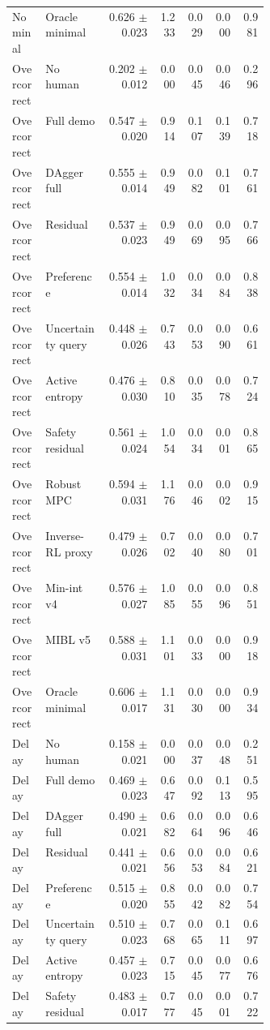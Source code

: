 \documentclass{article}
\begin{document}
\begin{center}
\begin{longtable}{p{0.13\linewidth}p{0.24\linewidth}rrrrr}
Nominal & Oracle minimal & 0.626 $\pm$ 0.023 & 1.233 & 0.029 & 0.000 & 0.981\\
Overcorrect & No human & 0.202 $\pm$ 0.012 & 0.000 & 0.045 & 0.046 & 0.296\\
Overcorrect & Full demo & 0.547 $\pm$ 0.020 & 0.914 & 0.107 & 0.139 & 0.718\\
Overcorrect & DAgger full & 0.555 $\pm$ 0.014 & 0.949 & 0.082 & 0.101 & 0.761\\
Overcorrect & Residual & 0.537 $\pm$ 0.023 & 0.949 & 0.069 & 0.095 & 0.766\\
Overcorrect & Preference & 0.554 $\pm$ 0.014 & 1.032 & 0.034 & 0.084 & 0.838\\
Overcorrect & Uncertainty query & 0.448 $\pm$ 0.026 & 0.743 & 0.053 & 0.090 & 0.661\\
Overcorrect & Active entropy & 0.476 $\pm$ 0.030 & 0.810 & 0.035 & 0.078 & 0.724\\
Overcorrect & Safety residual & 0.561 $\pm$ 0.024 & 1.054 & 0.034 & 0.001 & 0.865\\
Overcorrect & Robust MPC & 0.594 $\pm$ 0.031 & 1.176 & 0.046 & 0.002 & 0.915\\
Overcorrect & Inverse-RL proxy & 0.479 $\pm$ 0.026 & 0.702 & 0.040 & 0.080 & 0.701\\
Overcorrect & Min-int v4 & 0.576 $\pm$ 0.027 & 1.085 & 0.055 & 0.096 & 0.851\\
Overcorrect & MIBL v5 & 0.588 $\pm$ 0.031 & 1.101 & 0.033 & 0.000 & 0.918\\
Overcorrect & Oracle minimal & 0.606 $\pm$ 0.017 & 1.131 & 0.030 & 0.000 & 0.934\\
Delay & No human & 0.158 $\pm$ 0.021 & 0.000 & 0.037 & 0.048 & 0.251\\
Delay & Full demo & 0.469 $\pm$ 0.023 & 0.647 & 0.092 & 0.113 & 0.595\\
Delay & DAgger full & 0.490 $\pm$ 0.021 & 0.682 & 0.064 & 0.096 & 0.646\\
Delay & Residual & 0.441 $\pm$ 0.021 & 0.656 & 0.053 & 0.084 & 0.621\\
Delay & Preference & 0.515 $\pm$ 0.020 & 0.855 & 0.042 & 0.082 & 0.754\\
Delay & Uncertainty query & 0.510 $\pm$ 0.023 & 0.768 & 0.065 & 0.111 & 0.697\\
Delay & Active entropy & 0.457 $\pm$ 0.023 & 0.715 & 0.045 & 0.077 & 0.676\\
Delay & Safety residual & 0.483 $\pm$ 0.017 & 0.777 & 0.045 & 0.001 & 0.722\\

\end{longtable}
\end{center}
\end{document}
